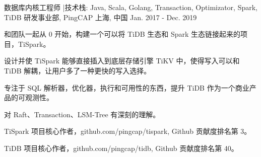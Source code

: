 \begin{cventries}
  \cventry
    {数据库内核工程师 \enskip|\enskip 技术栈: Java, Scala, Golang, Transaction, Optimizator, Spark, TiDB} %
    {研发事业部, PingCAP} %
    {上海, 中国} %
    {Jan. 2017 - Dec. 2019} %
    {
      \begin{cvitems} %
        \item {和团队一起从 0 开始，构建一个可以将 TiDB 生态和 Spark 生态链接起来的项目，TiSpark。}
        \item {设计并使 TiSpark 能够直接插入到底层存储引擎 TiKV 中，使得写入可以和 TiDB 解耦，让用户多了一种更快的写入选择。}
        \item {专注于 SQL 解析器，优化器，执行和可用性的东西，提升 TiDB 作为一个商业产品的可观测性。}
        \item {对 Raft、Transaction、LSM-Tree 有深刻的理解。}
        \item {TiSpark 项目核心作者，github.com/pingcap/tispark, Github 贡献度排名第 3。}
        \item {TiDB 项目核心作者，github.com/pingcap/tidb, Github 贡献度排名第 40。}
      \end{cvitems}
    }
\end{cventries}
